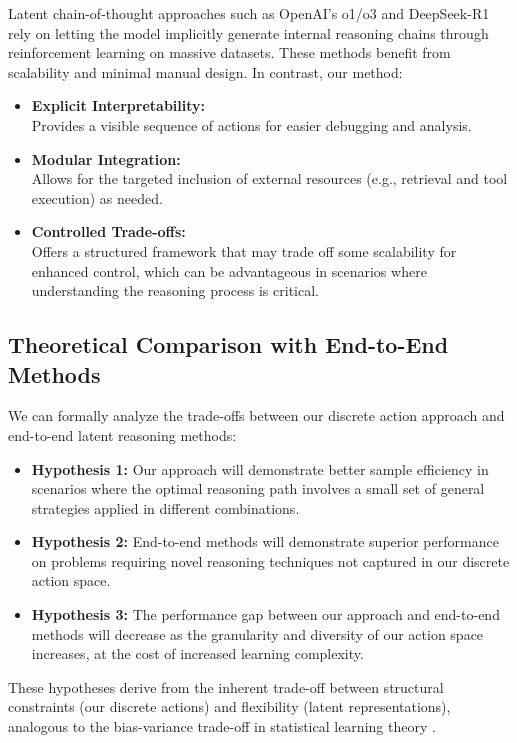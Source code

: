 \documentclass[10pt,journal,compsoc]{IEEEtran}
\begin{document}
Latent chain-of-thought approaches such as OpenAI's o1/o3 and
DeepSeek-R1 rely on letting the model implicitly generate internal
reasoning chains through reinforcement learning on massive datasets.
These methods benefit from scalability and minimal manual design. In
contrast, our method:

\begin{itemize}
\item
  \textbf{Explicit Interpretability:}\\
  Provides a visible sequence of actions for easier debugging and
  analysis.
\item
  \textbf{Modular Integration:}\\
  Allows for the targeted inclusion of external resources (e.g.,
  retrieval and tool execution) as needed.
\item
  \textbf{Controlled Trade-offs:}\\
  Offers a structured framework that may trade off some scalability for
  enhanced control, which can be advantageous in scenarios where
  understanding the reasoning process is critical.
\end{itemize}

\subsection{Theoretical Comparison with End-to-End Methods}

We can formally analyze the trade-offs between our discrete action approach and end-to-end latent reasoning methods:

\begin{itemize}
\item \textbf{Hypothesis 1:} Our approach will demonstrate better sample efficiency in scenarios where the optimal reasoning path involves a small set of general strategies applied in different combinations.

\item \textbf{Hypothesis 2:} End-to-end methods will demonstrate superior performance on problems requiring novel reasoning techniques not captured in our discrete action space.

\item \textbf{Hypothesis 3:} The performance gap between our approach and end-to-end methods will decrease as the granularity and diversity of our action space increases, at the cost of increased learning complexity.
\end{itemize}

These hypotheses derive from the inherent trade-off between structural constraints (our discrete actions) and flexibility (latent representations), analogous to the bias-variance trade-off in statistical learning theory \citep{geman1992neural}.
\end{document}
